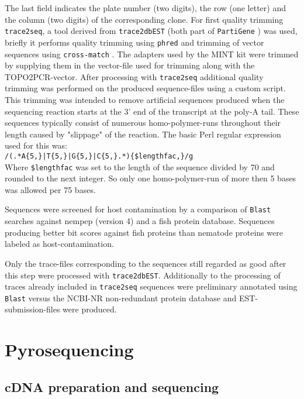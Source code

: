 The last field indicates the plate number (two digits), the row (one
letter) and the column (two digits) of the corresponding clone. For
first quality trimming \texttt{trace2seq}, a tool derived from
\texttt{trace2dbEST} (both part of \texttt{PartiGene}
\cite{parkinson_partigene--constructing_2004}) was used, briefly it
performs quality trimming using \texttt{phred}
\cite{ewing_base-calling_1998} and trimming of vector sequences using
\texttt{cross-match} \cite{PHRAP}. The adapters used by the MINT kit
were trimmed by supplying them in the vector-file used for trimming
along with the TOPO2PCR-vector. After processing with
\texttt{trace2seq} additional quality trimming was performed on the
produced sequence-files using a custom script. This trimming was
intended to remove artificial sequences produced when the sequencing
reaction starts at the 3' end of the transcript at the poly-A
tail. These sequences typically consist of numerous homo-polymer-runs
throughout their length caused by "slippage" of the reaction.
The basic Perl regular expression used for this was:\\

\texttt{/(.*A\{5,\}|T\{5,\}|G\{5,\}|C\{5,\}.*)\{\$lengthfac,\}/g}\\

Where \texttt{\$lengthfac} was set to the length of the sequence
divided by 70 and rounded to the next integer. So only one
homo-polymer-run of more then 5 bases was allowed per 75 bases.

Sequences were screened for host contamination by a comparison of
\texttt{Blast} searches against nempep \cite{pmid21550347} (version 4)
and a fish protein database. Sequences producing better bit scores
against fish proteins than nematode proteins were labeled as
host-contamination.

Only the trace-files corresponding to the sequences still regarded as
good after this step were processed with
\texttt{trace2dbEST}. Additionally to the processing of traces already
included in \texttt{trace2seq} sequences were preliminary annotated
using \texttt{Blast} versus the NCBI-NR non-redundant protein database
and EST-submission-files were produced.

\section{Pyrosequencing}

\subsection{cDNA preparation and sequencing}

